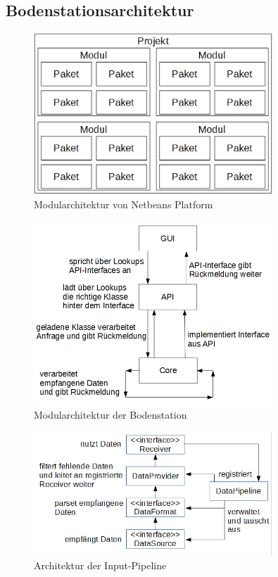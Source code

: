 \newpage
\subsection{Bodenstationsarchitektur}
\begin{figure}[H]
	\centering
	\includegraphics[width=0.8\textwidth]{3_Beschreibung_der_Bodenstation/NBP_Modularchitektur.png}
	\caption{Modularchitektur von Netbeans Platform}
	\label{nbp_modularchitektur}
\end{figure}

\begin{figure}[H]
	\centering
	\includegraphics[width=0.8\textwidth]{3_Beschreibung_der_Bodenstation/Bodenstation_Modularchitektur.png}
	\caption{Modularchitektur der Bodenstation}
	\label{station_modularchitektur}
\end{figure}
\vspace{-5cm}
\newpage

\begin{figure}[H]
	\centering
	\includegraphics[width=0.8\textwidth]{3_Beschreibung_der_Bodenstation/Input-Pipeline_Architektur.png}
	\caption{Architektur der Input-Pipeline}
	\label{inputpipeline}
\end{figure}